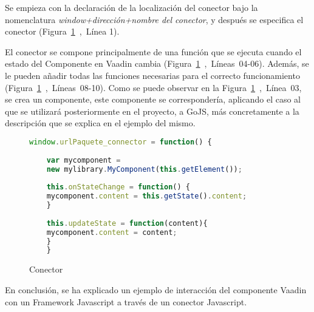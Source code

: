 Se empieza con la declaración de la localización del conector bajo la nomenclatura \emph{window+dirección+nombre del conector}, y después se especifica el conector (Figura~\ref{fig:conectorDesc}~,~Línea 1).

El conector se compone principalmente de una función que se ejecuta cuando el estado del Componente en Vaadin cambia (Figura~\ref{fig:conectorDesc}~,~Líneas~04-06). Además, se le pueden añadir todas las funciones necesarias para el correcto funcionamiento (Figura~\ref{fig:conectorDesc}~,~Líneas~08-10). Como se puede observar en la Figura~\ref{fig:conectorDesc}~,~Línea~03, se crea un componente, este componente se correspondería, aplicando el caso al que se utilizará posteriormente en el proyecto, a GoJS, más concretamente a la descripción que se explica en el ejemplo del mismo.


\begin{figure}[!tb]
	\centering
	\begin{lstlisting}[language=JavaScript]
	window.urlPaquete_connector = function() {
	
	var mycomponent = 
	new mylibrary.MyComponent(this.getElement());
	
	this.onStateChange = function() {
	mycomponent.content = this.getState().content;
	}
	
	this.updateState = function(content){
	mycomponent.content = content;
	}
	}
	\end{lstlisting}
	\caption{Conector}
	\label{fig:conectorDesc}
\end{figure}

En conclusión, se ha explicado un ejemplo de interacción del componente Vaadin con un Framework Javascript a través de un conector Javascript.